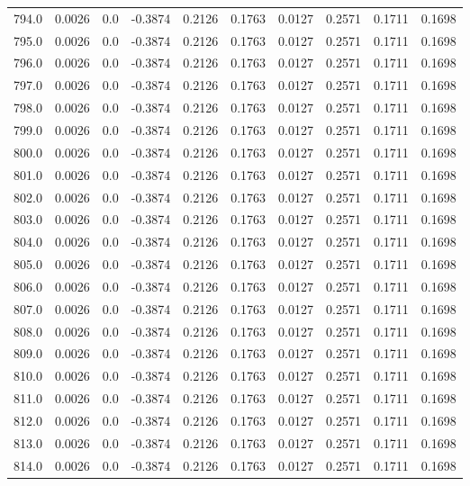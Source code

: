 \begin{longtable}{lrrrrrrrrr}
794.0 & 0.0026 & 0.0 & -0.3874 & 0.2126 & 0.1763 & 0.0127 & 0.2571 & 0.1711 & 0.1698 \\
795.0 & 0.0026 & 0.0 & -0.3874 & 0.2126 & 0.1763 & 0.0127 & 0.2571 & 0.1711 & 0.1698 \\
796.0 & 0.0026 & 0.0 & -0.3874 & 0.2126 & 0.1763 & 0.0127 & 0.2571 & 0.1711 & 0.1698 \\
797.0 & 0.0026 & 0.0 & -0.3874 & 0.2126 & 0.1763 & 0.0127 & 0.2571 & 0.1711 & 0.1698 \\
798.0 & 0.0026 & 0.0 & -0.3874 & 0.2126 & 0.1763 & 0.0127 & 0.2571 & 0.1711 & 0.1698 \\
799.0 & 0.0026 & 0.0 & -0.3874 & 0.2126 & 0.1763 & 0.0127 & 0.2571 & 0.1711 & 0.1698 \\
800.0 & 0.0026 & 0.0 & -0.3874 & 0.2126 & 0.1763 & 0.0127 & 0.2571 & 0.1711 & 0.1698 \\
801.0 & 0.0026 & 0.0 & -0.3874 & 0.2126 & 0.1763 & 0.0127 & 0.2571 & 0.1711 & 0.1698 \\
802.0 & 0.0026 & 0.0 & -0.3874 & 0.2126 & 0.1763 & 0.0127 & 0.2571 & 0.1711 & 0.1698 \\
803.0 & 0.0026 & 0.0 & -0.3874 & 0.2126 & 0.1763 & 0.0127 & 0.2571 & 0.1711 & 0.1698 \\
804.0 & 0.0026 & 0.0 & -0.3874 & 0.2126 & 0.1763 & 0.0127 & 0.2571 & 0.1711 & 0.1698 \\
805.0 & 0.0026 & 0.0 & -0.3874 & 0.2126 & 0.1763 & 0.0127 & 0.2571 & 0.1711 & 0.1698 \\
806.0 & 0.0026 & 0.0 & -0.3874 & 0.2126 & 0.1763 & 0.0127 & 0.2571 & 0.1711 & 0.1698 \\
807.0 & 0.0026 & 0.0 & -0.3874 & 0.2126 & 0.1763 & 0.0127 & 0.2571 & 0.1711 & 0.1698 \\
808.0 & 0.0026 & 0.0 & -0.3874 & 0.2126 & 0.1763 & 0.0127 & 0.2571 & 0.1711 & 0.1698 \\
809.0 & 0.0026 & 0.0 & -0.3874 & 0.2126 & 0.1763 & 0.0127 & 0.2571 & 0.1711 & 0.1698 \\
810.0 & 0.0026 & 0.0 & -0.3874 & 0.2126 & 0.1763 & 0.0127 & 0.2571 & 0.1711 & 0.1698 \\
811.0 & 0.0026 & 0.0 & -0.3874 & 0.2126 & 0.1763 & 0.0127 & 0.2571 & 0.1711 & 0.1698 \\
812.0 & 0.0026 & 0.0 & -0.3874 & 0.2126 & 0.1763 & 0.0127 & 0.2571 & 0.1711 & 0.1698 \\
813.0 & 0.0026 & 0.0 & -0.3874 & 0.2126 & 0.1763 & 0.0127 & 0.2571 & 0.1711 & 0.1698 \\
814.0 & 0.0026 & 0.0 & -0.3874 & 0.2126 & 0.1763 & 0.0127 & 0.2571 & 0.1711 & 0.1698 \\

\end{longtable}
